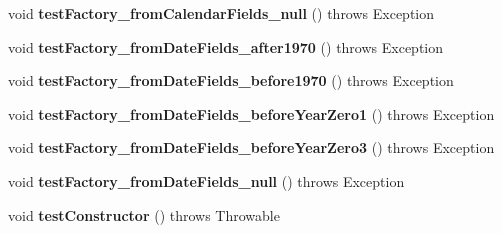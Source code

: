 \begin{DoxyCompactItemize}
\item 
\hypertarget{classorg_1_1joda_1_1time_1_1_test_local_date_time___constructors_aa581c3c8d68cbc4260eb0156aded3517}{void {\bfseries test\-Factory\-\_\-from\-Calendar\-Fields\-\_\-null} ()  throws Exception }\label{classorg_1_1joda_1_1time_1_1_test_local_date_time___constructors_aa581c3c8d68cbc4260eb0156aded3517}

\item 
\hypertarget{classorg_1_1joda_1_1time_1_1_test_local_date_time___constructors_a21a8c1e5f3683ac32c7f9d51a4504ada}{void {\bfseries test\-Factory\-\_\-from\-Date\-Fields\-\_\-after1970} ()  throws Exception }\label{classorg_1_1joda_1_1time_1_1_test_local_date_time___constructors_a21a8c1e5f3683ac32c7f9d51a4504ada}

\item 
\hypertarget{classorg_1_1joda_1_1time_1_1_test_local_date_time___constructors_ad8f3e3db3717982a83c6290adde1072d}{void {\bfseries test\-Factory\-\_\-from\-Date\-Fields\-\_\-before1970} ()  throws Exception }\label{classorg_1_1joda_1_1time_1_1_test_local_date_time___constructors_ad8f3e3db3717982a83c6290adde1072d}

\item 
\hypertarget{classorg_1_1joda_1_1time_1_1_test_local_date_time___constructors_a20d50e67d7a187ad2a5f3289e90d4d88}{void {\bfseries test\-Factory\-\_\-from\-Date\-Fields\-\_\-before\-Year\-Zero1} ()  throws Exception }\label{classorg_1_1joda_1_1time_1_1_test_local_date_time___constructors_a20d50e67d7a187ad2a5f3289e90d4d88}

\item 
\hypertarget{classorg_1_1joda_1_1time_1_1_test_local_date_time___constructors_a5ec55e250d58831560512846f072293f}{void {\bfseries test\-Factory\-\_\-from\-Date\-Fields\-\_\-before\-Year\-Zero3} ()  throws Exception }\label{classorg_1_1joda_1_1time_1_1_test_local_date_time___constructors_a5ec55e250d58831560512846f072293f}

\item 
\hypertarget{classorg_1_1joda_1_1time_1_1_test_local_date_time___constructors_ae8eed093295a31387ccb0e7f919e7881}{void {\bfseries test\-Factory\-\_\-from\-Date\-Fields\-\_\-null} ()  throws Exception }\label{classorg_1_1joda_1_1time_1_1_test_local_date_time___constructors_ae8eed093295a31387ccb0e7f919e7881}

\item 
\hypertarget{classorg_1_1joda_1_1time_1_1_test_local_date_time___constructors_ac962bf6ae21360d9e3ba70761d27f5e4}{void {\bfseries test\-Constructor} ()  throws Throwable }\label{classorg_1_1joda_1_1time_1_1_test_local_date_time___constructors_ac962bf6ae21360d9e3ba70761d27f5e4}


\end{DoxyCompactItemize}
